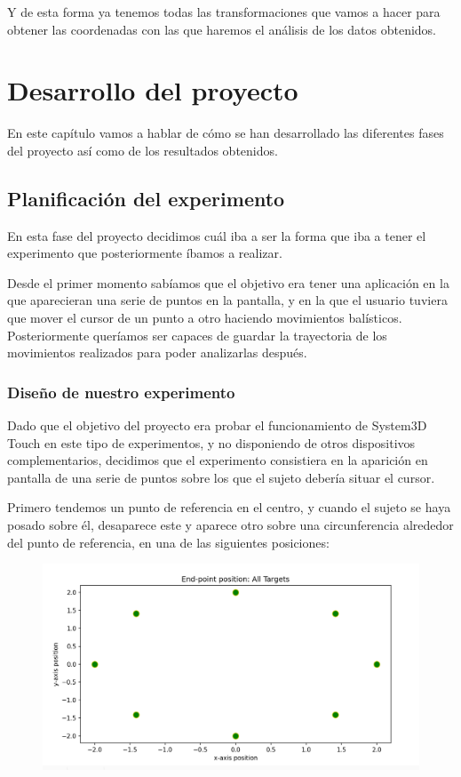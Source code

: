 \documentclass[a4paper,11pt, oneside]{book}
\begin{document}
Y de esta forma ya tenemos todas las transformaciones que vamos a hacer para obtener las coordenadas con las que haremos el análisis de los datos obtenidos.


\chapter{Desarrollo del proyecto}




En este capítulo vamos a hablar de cómo se han desarrollado las diferentes fases del proyecto así como de los resultados obtenidos.

\section{Planificación del experimento}

En esta fase del proyecto decidimos cuál iba a ser la forma que iba a tener el experimento que posteriormente íbamos a realizar.

Desde el primer momento sabíamos que el objetivo era tener una aplicación en la que aparecieran una serie de puntos en la pantalla, y en la que el usuario tuviera que mover el cursor de un punto a otro haciendo movimientos balísticos. Posteriormente queríamos ser capaces de guardar la trayectoria de los movimientos realizados para poder analizarlas después.



\subsection{Diseño de nuestro experimento}

Dado que el objetivo del proyecto era probar el funcionamiento de System3D Touch en este tipo de experimentos, y no disponiendo de otros dispositivos complementarios, decidimos que el experimento consistiera en la aparición en pantalla de una serie de puntos sobre los que el sujeto debería situar el cursor.

Primero tendemos un punto de referencia en el centro, y cuando el sujeto se haya posado sobre él, desaparece este y aparece otro sobre una circunferencia alrededor del punto de referencia, en una de las siguientes posiciones:
\begin{figure}[H]
	
	\centering
	\includegraphics[width=0.6\linewidth]{points}
	\label{fig:figura1}
	
\end{figure}
\end{document}
